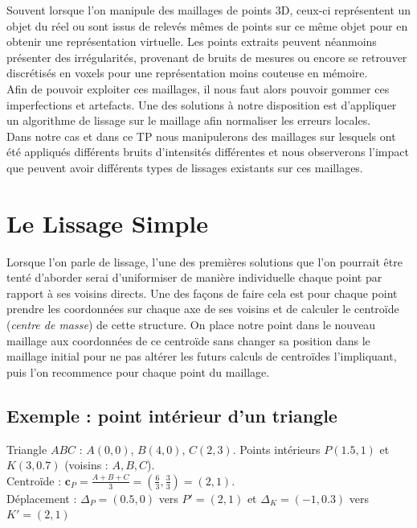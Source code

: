 \documentclass[11pt,a4paper]{article}
\begin{document}
Souvent lorsque l'on manipule des maillages de points 3D, ceux-ci représentent un objet du réel
ou sont issus de relevés mêmes de points sur ce même objet pour en obtenir une représentation virtuelle.
Les points extraits peuvent néanmoins présenter des irrégularités, provenant de bruits de mesures ou encore se 
retrouver discrétisés en voxels pour une représentation moins couteuse en mémoire.\\
Afin de pouvoir exploiter ces maillages, il nous faut alors pouvoir gommer ces imperfections et artefacts.
Une des solutions à notre disposition est d'appliquer un algorithme de lissage sur le maillage afin normaliser les erreurs locales.\\
Dans notre cas et dans ce TP nous manipulerons des maillages sur lesquels ont été appliqués différents bruits d'intensités différentes et 
nous observerons l'impact que peuvent avoir différents types de lissages existants sur ces maillages.

\newpage

\section{Le Lissage Simple}
Lorsque l'on parle de lissage, l'une des premières solutions que l'on pourrait être tenté d'aborder serai d'uniformiser de manière individuelle chaque point par rapport à ses voisins directs.
Une des façons de faire cela est pour chaque point prendre les coordonnées sur chaque axe de ses voisins et de calculer le centroïde (\textit{centre de masse}) de cette structure. 
On place notre point dans le nouveau maillage aux coordonnées de ce centroïde sans changer sa position dans le maillage initial pour ne pas altérer les futurs calculs de centroïdes l'impliquant, 
puis l'on recommence pour chaque point du maillage.


\subsection{Exemple : point intérieur d'un triangle}

Triangle $ABC$ : $A(0,0)$, $B(4,0)$, $C(2,3)$. Points intérieurs $P(1.5,1)$ et $K(3,0.7)$ (voisins : $A,B,C$).\\

Centroïde : $\mathbf{c}_P = \frac{A + B + C}{3} = \left( \frac{6}{3}, \frac{3}{3} \right) = (2,1)$.\\

Déplacement : $\Delta_P = (0.5, 0)$ vers $P' = (2,1)$ et  $\Delta_K = (-1, 0.3)$ vers $K' = (2,1)$
\end{document}
